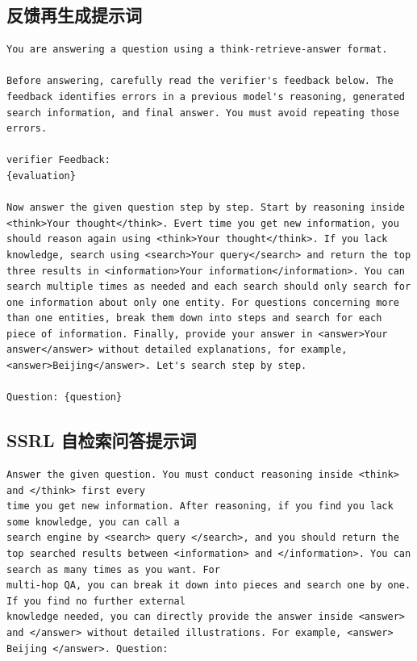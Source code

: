 \subsection{反馈再生成提示词}

\begin{lstlisting}[basicstyle=\ttfamily\small,breaklines=true,columns=fullflexible,frame=single,framerule=0.4pt,xleftmargin=1em,xrightmargin=1em]
You are answering a question using a think-retrieve-answer format.

Before answering, carefully read the verifier's feedback below. The feedback identifies errors in a previous model's reasoning, generated search information, and final answer. You must avoid repeating those errors.

verifier Feedback:
{evaluation}

Now answer the given question step by step. Start by reasoning inside <think>Your thought</think>. Evert time you get new information, you should reason again using <think>Your thought</think>. If you lack knowledge, search using <search>Your query</search> and return the top three results in <information>Your information</information>. You can search multiple times as needed and each search should only search for one information about only one entity. For questions concerning more than one entities, break them down into steps and search for each piece of information. Finally, provide your answer in <answer>Your answer</answer> without detailed explanations, for example, <answer>Beijing</answer>. Let's search step by step.

Question: {question}

\end{lstlisting}

\subsection{SSRL 自检索问答提示词}

\begin{lstlisting}[basicstyle=\ttfamily\small,breaklines=true,columns=fullflexible,frame=single,framerule=0.4pt,xleftmargin=1em,xrightmargin=1em]
Answer the given question. You must conduct reasoning inside <think> and </think> first every
time you get new information. After reasoning, if you find you lack some knowledge, you can call a
search engine by <search> query </search>, and you should return the top searched results between <information> and </information>. You can search as many times as you want. For
multi-hop QA, you can break it down into pieces and search one by one. If you find no further external
knowledge needed, you can directly provide the answer inside <answer> and </answer> without detailed illustrations. For example, <answer> Beijing </answer>. Question:
\end{lstlisting}

